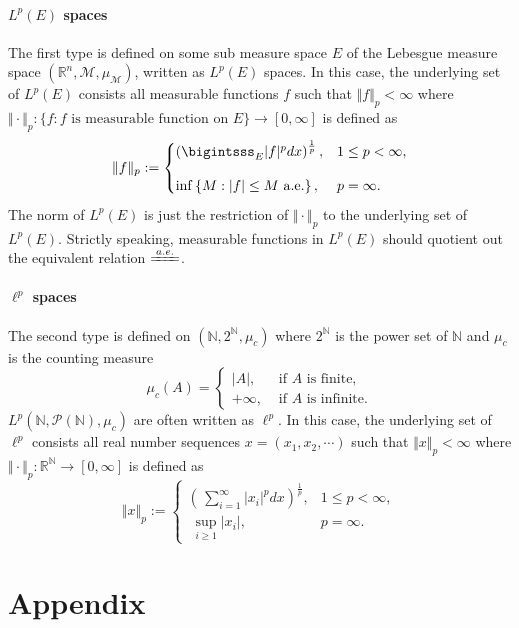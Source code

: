\documentclass{report}
\theoremstyle{nonumberplain}
\begin{document}
\subsubsection{$L^p(E)$ spaces}
The first type is defined on some sub measure space $E$ of the Lebesgue measure space $(\mathbb{R}^n, \mathcal{M}, \mu_{\mathcal{M}})$, written as $L^p(E)$ spaces. In this case, the underlying set of $L^p(E)$ consists all measurable functions $f$ such that $\Vert f\Vert_p <\infty$ where $\Vert \cdot\Vert_p:\{f:f\text{ is measurable function on }E\}\to[0,\infty]$ is defined as
\[
	\Vert f\Vert_p:=
	\begin{cases}
		\left(\bigintsss_E |f|^pdx\right)^{\frac{1}{p}},&1\le p< \infty,\\[10pt]
		\inf \left\{M: |f|\le M\text{ a.e.}\right\},&p=\infty.
	\end{cases}	
\]
The norm of $L^p(E)$ is just the restriction of $\Vert \cdot\Vert_p$ to the underlying set of $L^p(E)$. Strictly speaking, measurable functions in $L^p(E)$ should quotient out the equivalent relation $\xlongequal{a.e.}$.
\subsubsection{$\ell^p$ spaces}
The second type is defined on $(\mathbb{N},2^\mathbb{N},\mu_c)$ where $2^\mathbb{N}$ is the power set of $\mathbb{N}$ and $\mu_c$ is the counting measure
\[
\mu_c(A)= 
\begin{cases}
	|A|, & \text { if } A \text { is finite}, \\
	+\infty, & \text { if } A \text { is infinite}.
\end{cases}
\]
$L^p(\mathbb{N},\mathcal{P}(\mathbb{N}),\mu_c)$ are often written as $\ell^p$. In this case, the underlying set of $\ell^p$ consists all real number sequences $x=(x_1,x_2,\cdots)$ such that $\Vert x\Vert_p <\infty$ where $\Vert \cdot\Vert_p:\mathbb{R}^\mathbb{N}\to[0,\infty]$ is defined as
\[
	\Vert x\Vert_p:=
	\begin{cases}
		\left(\,\sum\limits_{i=1}^\infty |x_i|^pdx\right)^{\frac{1}{p}},&1\le p< \infty,\\[10pt]
		\;\sup\limits_{i\ge 1}|x_i|,&p=\infty.
	\end{cases}	
\]

\chapter*{Appendix}
\end{document}

